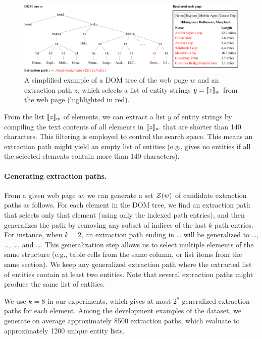 \begin{figure}
\centering
\includegraphics[width=\textwidth]{sfig/openweb.slides/extractionExample.pdf}
\caption[
Example of a DOM tree an extraction path.
]{A simplified example of a DOM tree of the web page $w$
and an extraction path $z$,
which selects a list of entity strings
$y = \llbracket{z}\rrbracket_{w}$ from the web page (highlighted in {\color{red}red}).}
\label{fig:openweb-extraction-path}
\end{figure}

From the list $\llbracket{z}\rrbracket_{w}$ of elements,
we can extract a list $y$ of entity strings
by compiling the text contents
of all elements in $\llbracket{z}\rrbracket_{w}$
that are shorter than 140 characters.
This filtering is employed to control the search space.
This means an extraction path might yield an empty list of entities
(e.g.,  gives no entities
if all the selected  elements contain
more than 140 characters).

\paragraph{Generating extraction paths.}
From a given web page $w$,
we can generate a set $\mathcal{Z}(w)$ of candidate extraction paths
as follows.
For each element in the DOM tree,
we find an extraction path that selects only that element
(using only the indexed path entries),
and then generalizes the path by removing
any subset of indices of the last $k$ path entries.
For instance, when $k = 2$,
an extraction path ending in
\dots{}
will be generalized to
\dots{},
\dots{},
\dots{}, and
\dots{}.
This generalization step allows us to select
multiple elements of the same structure
(e.g., table cells from the same column,
or list items from the same section).
We keep any generalized extraction path
where the extracted list of entities contain at least two entities.
Note that several extraction paths
might produce the same list of entities.

We use $k = 8$ in our experiments,
which gives at most $2^8$ generalized extraction paths
for each element.
Among the development examples of the  dataset,
we generate on average approximately 8500 extraction paths,
which evaluate to approximately 1200 unique entity lists.

